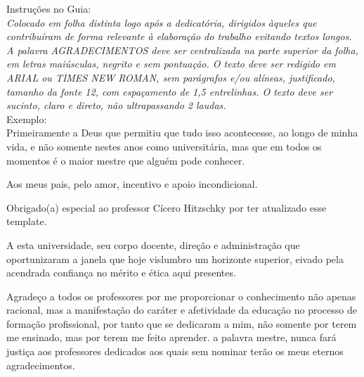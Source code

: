 Instruções no Guia:\\
\textit{Colocado em folha distinta logo após a dedicatória, dirigidos àqueles que
contribuíram de forma relevante à elaboração do trabalho evitando textos longos. A palavra
AGRADECIMENTOS deve ser centralizada na parte superior da folha, em letras maiúsculas,
negrito e sem pontuação. 
O texto deve ser redigido em ARIAL ou TIMES NEW ROMAN, sem
parágrafos e/ou alíneas, justificado, tamanho da fonte 12, com espaçamento de 1,5 entrelinhas.
O texto deve ser sucinto, claro e direto, não ultrapassando 2 laudas.}
\\

Exemplo:\\

Primeiramente a Deus que permitiu que tudo isso acontecesse, ao longo de minha vida, e não somente nestes anos como universitária, mas que em todos os momentos é o maior mestre que alguém pode conhecer.
	
Aos meus pais, pelo amor, incentivo e apoio incondicional.

Obrigado(a) especial ao professor Cícero Hitzschky por ter atualizado esse template.

A esta universidade, seu corpo docente, direção e administração que oportunizaram a janela que hoje vislumbro um horizonte superior, eivado pela acendrada confiança no mérito e ética aqui presentes.

Agradeço a todos os professores por me proporcionar o conhecimento não apenas racional, mas a manifestação do caráter e afetividade da educação no processo de formação profissional, por tanto que se dedicaram a mim, não somente por terem me ensinado, mas por terem me feito aprender. a palavra mestre, nunca fará justiça aos professores dedicados aos quais sem nominar terão os meus eternos agradecimentos.